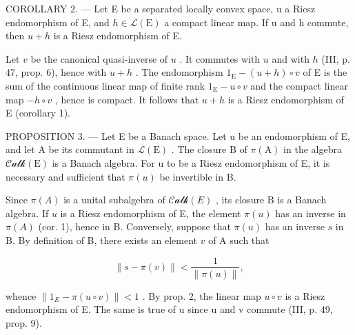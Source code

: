 COROLLARY 2. --- Let E be a separated locally convex space, u a Riesz endomorphism of E, and \(h \in \mathcal{L}(\mathrm{E})\) a compact linear map. If u and h commute, then \(u + h\) is a Riesz endomorphism of E.

Let \(v\) be the canonical quasi-inverse of \(u\) . It commutes with \(u\) and with \(h\) (III, p. 47, prop. 6), hence with \(u + h\) . The endomorphism \(1_{\mathrm{E}} - (u + h) \circ v\) of E is the sum of the continuous linear map of finite rank \(1_{\mathrm{E}} - u \circ v\) and the compact linear map \(-h \circ v\) , hence is compact. It follows that \(u + h\) is a Riesz endomorphism of E (corollary 1).

PROPOSITION 3. --- Let E be a Banach space. Let u be an endomorphism of E, and let A be its commutant in \(\mathcal{L}(\mathrm{E})\) . The closure B of \(\pi(\mathrm{A})\) in the algebra \(\mathcal{Calk}(\mathrm{E})\) is a Banach algebra. For u to be a Riesz endomorphism of E, it is necessary and sufficient that \(\pi(u)\) be invertible in B.

Since \(\pi(A)\) is a unital subalgebra of \(\mathcal{Calk}(E)\) , its closure B is a Banach algebra. If \(u\) is a Riesz endomorphism of E, the element \(\pi(u)\) has an inverse in \(\pi(A)\) (cor. 1), hence in B. Conversely, suppose that \(\pi(u)\) has an inverse \(s\) in B. By definition of B, there exists an element \(v\) of A such that

\[
\left\| s - \pi (v) \right\| <   \frac {1}{\left\| \pi (u) \right\|},
\]

whence \(\|1_{E}-\pi(u\circ v)\|<1\) . By prop. 2, the linear map \(u\circ v\) is a Riesz endomorphism of E. The same is true of u since u and v commute (III, p. 49, prop. 9).

